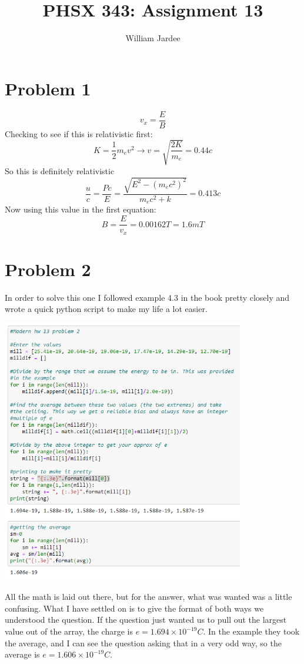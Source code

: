 \documentclass[11pt]{article}
\begin{document}
\date{}

\title{PHSX 343: Assignment 13}

\author{William Jardee}

\maketitle

\section*{Problem 1}
    \[v_x = \frac{E}{B}\]
    Checking to see if this is relativistic first: 
    \[K=\frac{1}{2}m_ev^2 \rightarrow v = \sqrt{\frac{2K}{m_e}} = 0.44c\]
    So this is definitely relativistic
    \[\frac{u}{c}=\frac{Pc}{E}=\frac{\sqrt{E^2 - (m_ec^2)^2}}{m_ec^2+k} = 0.413c\]
    Now using this value in the first equation:
    \[B = \frac{E}{v_x} = 0.00162T = \boxed{1.6 mT}\]

\section*{Problem 2}
    In order to solve this one I followed example 4.3 in the book pretty closely and wrote a quick python script to make my life a lot easier.\\
    \begin{center}
     \includegraphics[width = 400]{Homework13/problem 2.PNG}
    \end{center}
    All the math is laid out there, but for the answer, what was wanted was a little confusing. What I have settled on is to give the format of both ways we understood the question. If the question just wanted us to pull out the largest value out of the array, the charge is $e=1.694\times 10^{-19} C$. In the example they took the average, and I can see the question asking that in a very odd way, so the average is $e=1.606 \times 10^{-19}C$.
\end{document}
